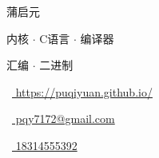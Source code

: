 \begin{scriptsize}
\end{scriptsize}

\vspace*{-0.10em}
\begin{Large} 
蒲启元
\end{Large}

\vspace*{0.25em}
\begin{scshape}
 \begin{footnotesize}
    \textcolor{highlight2}{内核 $\cdot$ C语言 $\cdot$ 编译器}
    
    \vspace*{-1ex}
    \textcolor{highlight2}{汇编 $\cdot$ 二进制}
 \end{footnotesize}
\end{scshape}
\vspace*{0.4cm}

\begin{footnotesize}
 \begin{tiny}\faHome\end{tiny}~\href{https://google.com}{
  https://puqiyuan.github.io/
 }
 \quad \begin{tiny}\faEnvelope[regular]\end{tiny}~\href{mailto:me@mywebsite.com}{%
  pqy7172@gmail.com
 } 
 
 \begin{tiny}\faMobile*\end{tiny}~\href{tel:001555555555}{
  18314555392
 } 
 \quad 

\end{footnotesize}

